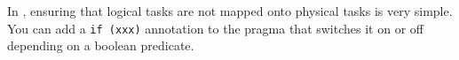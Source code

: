 \noindent
In \openmp, ensuring that logical tasks are not mapped onto physical tasks is very simple.
You can add a \texttt{if (xxx)} annotation to the pragma that switches it on or off depending on a boolean predicate.


% 
% 
% 
% 


